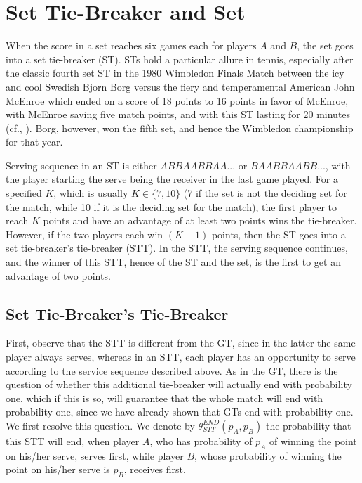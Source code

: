 \documentclass[11pt]{article}
\theoremstyle{plain}
\theoremstyle{definition}
\begin{document}
\section{Set Tie-Breaker and Set}
\label{sec: Set}

When the score in a set reaches six games each for players $A$ and $B$, the set goes into a set tie-breaker (ST). STs hold a particular allure in tennis, especially after the classic fourth set ST in the 1980 Wimbledon Finals Match between the icy and cool Swedish Bjorn Borg versus the fiery and temperamental American John McEnroe which ended on a score of 18 points to 16 points in favor of McEnroe, with McEnroe saving five match points, and with this ST lasting for 20 minutes (cf., \cite{BorgMcEnroeRivalry}). Borg, however, won the fifth set, and hence the Wimbledon championship for that year. 

Serving sequence in an ST is either $ABBAABBAA...$ or $BAABBAABB...$, with the player starting the serve being the receiver in the last game played. For a specified $K$, which is usually $K \in \{7, 10\}$ (7 if the set is not the deciding set for the match, while 10 if it is the deciding set for the match), the first player to reach $K$ points and have an advantage of at least two points wins the tie-breaker. However, if the two players each win $(K-1)$ points, then the ST goes into a set tie-breaker's tie-breaker (STT). In the STT, the serving sequence continues, and the winner of this STT, hence of the ST and the set, is the first to get an advantage of two points.

\subsection{Set Tie-Breaker's Tie-Breaker}

First, observe that the STT is different from the GT, since in the latter the same player always serves, whereas in an STT, each player has an opportunity to serve according to the service sequence described above. As in the GT, there is the question of whether this additional tie-breaker will actually end with probability one, which if this is so, will guarantee that the whole match will end with probability one, since we have already shown that GTs end with probability one.
%
We first resolve this question. We denote by $\theta_{STT}^{END}(p_A,p_B)$ the probability that this STT will end, when player $A$, who has probability of $p_A$ of winning the point on his/her serve, serves first, while player $B$, whose probability of winning the point on his/her serve is $p_B$, receives first.
\end{document}

